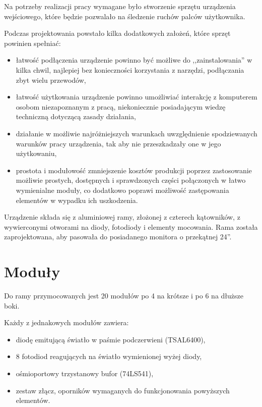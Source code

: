 \label{ch:hardware}

Na potrzeby realizacji pracy wymagane było stworzenie sprzętu \pauza urządzenia wejściowego, które będzie pozwalało na śledzenie ruchów palców użytkownika.

Podczas projektowania powstało kilka dodatkowych założeń, które sprzęt powinien spełniać:
\begin{itemize}
 \item łatwość podłączenia \pauza urządzenie powinno być możliwe do ,,zainstalowania'' w kilka chwil, najlepiej bez konieczności korzystania z narzędzi, podłączania zbyt wielu przewodów,
 \item łatwość użytkowania \pauza urządzenie powinno umożliwiać interakcję z komputerem osobom niezapoznanym z pracą, niekoniecznie posiadającym wiedzę techniczną dotyczącą zasady działania,
 \item działanie w możliwie najróżniejszych warunkach \pauza uwzględnienie spodziewanych warunków pracy urządzenia, tak aby nie przeszkadzały one w jego użytkowaniu,
 \item prostota i modułowość \pauza zmniejszenie kosztów produkcji poprzez zastosowanie możliwie prostych, dostępnych i sprawdzonych części połączonych w łatwo wymienialne moduły, co dodatkowo poprawi możliwość zastępowania elementów w wypadku ich uszkodzenia.\\
\end{itemize}

Urządzenie składa się z aluminiowej ramy, złożonej z czterech kątowników, z wywierconymi otworami na diody, fotodiody i elementy mocowania. Rama została zaprojektowana, aby pasowała do posiadanego monitora o przekątnej 24''.

\section{Moduły}

Do ramy przymocowanych jest 20 modułów \pauza po 4 na krótsze i po 6 na dłuższe boki.

Każdy z jednakowych modułów zawiera:
\begin{itemize}
 \item diodę emitującą światło w paśmie podczerwieni (TSAL6400),
 \item 8 fotodiod reagujących na światło wymienionej wyżej diody,
 \item ośmioportowy trzystanowy bufor (74LS541),
 \item zestaw złącz, oporników wymaganych do funkcjonowania powyższych elementów.
\end{itemize}


